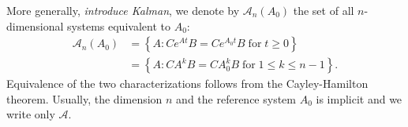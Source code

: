 \documentclass[9 pt]{article}
\newcommand{\plr}[1]{{\color{blue}\it #1}}
\newcommand{\calA}{\mathcal{A}}
\newcommand{\1}{\mathbbm{1}}
\begin{document}
  More generally, \plr{introduce Kalman},
  we denote by $\calA_n(A_0)$ the set of all $n$-dimensional systems equivalent to $A_0$:
  \begin{equation} \label{eqn:equivalence}
      \begin{aligned}
      \calA_n(A_0) 
          &= \left\{
              A : C e^{At} B = C e^{A_0 t} B \; \text{for}\; t \ge 0 
          \right\}  \\
          &= \left\{
              A : C A^k B = C A_0^k B \; \text{for}\; 1 \le k \le n-1 
          \right\} .
      \end{aligned}
  \end{equation}
  Equivalence of the two characterizations follows from the Cayley-Hamilton theorem.
  Usually, the dimension $n$ and the reference system $A_0$ is implicit and we write only $\calA$.
\end{document}

